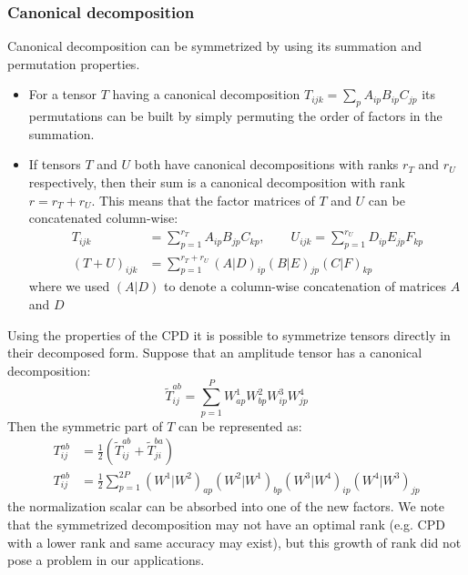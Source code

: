 \subsubsection{Canonical decomposition}
Canonical decomposition can be symmetrized by using its summation and 
permutation properties.
\begin{itemize}
  \item For a tensor $T$ having a canonical decomposition $T_{ijk} = \sum_{p} 
A_{ip} B_{ip} C_{jp}$ its permutations can be built by simply permuting the 
order of factors in the summation.
  \item If tensors $T$ and $U$ both have canonical decompositions with ranks 
$r_{T}$ and $r_{U}$ respectively, then their sum is a canonical decomposition 
with rank $r = r_{T} + r_{U}$. This means that the factor matrices of $T$ and 
$U$ can be concatenated column-wise:
%
\begin{equation}
\begin{aligned}
 T_{ijk} &= \sum_{p=1}^{r_{T}} A_{ip} B_{jp} C_{kp}, \qquad U_{ijk} = 
\sum_{p=1}^{r_{U}} D_{ip} E_{jp} F_{kp} \\
(T + U)_{ijk} &= \sum_{p=1}^{r_{T} + r_{U}} (A | D)_{ip} (B | E)_{jp} (C | 
F)_{kp}
\end{aligned}
\end{equation}
where we used $(A | D)$ to denote a column-wise concatenation of matrices $A$ 
and $D$
\end{itemize}
 
Using the properties of the CPD it is possible to symmetrize tensors directly 
in their decomposed form. Suppose that an amplitude tensor has a 
canonical decomposition:
%
\begin{equation}
 \tilde{T}_{ij}^{ab} = \sum_{p=1}^{P} W^{1}_{ap} W^{2}_{bp} 
W^{3}_{ip} W^{4}_{jp}
\end{equation}
%
Then the symmetric part of $T$ can be 
represented as:
%
\begin{equation}
\begin{aligned}
 T_{ij}^{ab} &= \frac{1}{2} (\tilde{T}_{ij}^{ab} + \tilde{T}_{ji}^{ba}) \\
 T_{ij}^{ab} &= \frac{1}{2} \sum_{p=1}^{2P} (W^{1} | W^{2})_{ap} (W^{2} | 
W^{1})_{bp} (W^{3} | W^{4})_{ip} (W^{4} | W^{3})_{jp} 
\end{aligned}
\end{equation}
%
the normalization scalar can be absorbed into one of the new factors. We note 
that the symmetrized decomposition may not have an optimal rank (e.g. 
CPD with a lower rank and same accuracy may exist), but this growth of rank did 
not pose a problem in our applications.

